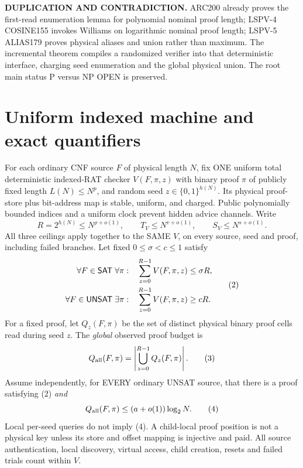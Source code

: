 \documentclass[11pt]{article}
\begin{document}
\textbf{DUPLICATION AND CONTRADICTION.} ARC200 already proves
the first-read enumeration lemma for polynomial nominal proof length;
LSPV-4 COSINE155 invokes Williams on logarithmic nominal proof length;
LSPV-5 ALIAS179 proves physical aliases and union rather than maximum.
The incremental theorem compiles a randomized verifier
into that deterministic interface, charging seed enumeration and the
global physical union. The root main status P versus NP OPEN is preserved.

\section{Uniform indexed machine and exact quantifiers}
For each ordinary CNF source $F$ of physical length $N$, fix ONE
uniform total deterministic indexed-RAT checker $V(F,\pi,z)$ with
binary proof $\pi$ of publicly fixed length $L(N)\le N^p$,
and random seed $z\in\{0,1\}^{h(N)}$.
Its physical proof-store plus bit-address map is stable, uniform,
and charged. Public polynomially bounded indices and a uniform clock
prevent hidden advice channels. Write
\[
R=2^{h(N)}\le N^{\rho+o(1)},\qquad
T_V\le N^{v+o(1)},\qquad S_V\le N^{s+o(1)}. \tag{1}
\]
All three ceilings apply together to the SAME $V$, on every
source, seed and proof, including failed branches.
Let fixed $0\le\sigma<c\le1$ satisfy
\[
\begin{split}
\forall F\in{\sf SAT}\;\forall\pi:
&\quad \sum_{z=0}^{R-1} V(F,\pi,z)\le\sigma R,\\
\forall F\in{\sf UNSAT}\;\exists\pi:
&\quad \sum_{z=0}^{R-1} V(F,\pi,z)\ge cR .
\end{split} \tag{2}
\]
For a fixed proof, let $Q_z(F,\pi)$ be the set of distinct physical
binary proof cells read during seed $z$. The \emph{global} observed
proof budget is
\[
Q_{\rm all}(F,\pi)=\left|\bigcup_{z=0}^{R-1}Q_z(F,\pi)\right|. \tag{3}
\]
Assume independently, for EVERY ordinary UNSAT source, that
there is a proof satisfying (2) \emph{and}
\[
Q_{\rm all}(F,\pi)\le(a+o(1))\log_2 N. \tag{4}
\]
Local per-seed queries do not imply (4). A child-local proof position
is not a physical key unless its store and offset mapping is
injective and paid. All source authentication, local discovery,
virtual access, child creation, resets and failed trials count
within $V$.
\end{document}
